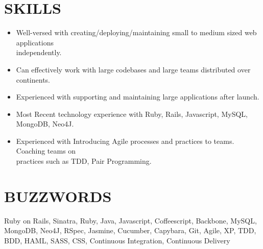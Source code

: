 \documentclass{res}
\begin{document}
\begin{resume}
\section{SKILLS} \vspace{0.15in}         
 \begin{itemize} \itemsep 0pt  
 \setlength{\itemindent}{-1.8em}
\item Well-versed with creating/deploying/maintaining small to medium sized web applications\\ independently.
\item Can effectively work with large codebases and large teams distributed over continents.
\item Experienced with supporting and maintaining large applications after launch.
\item Most Recent technology experience with Ruby, Rails, Javascript, MySQL, MongoDB, Neo4J. 
\item Experienced with Introducing Agile processes and practices to teams. Coaching teams on \\practices such as TDD, Pair Programming.

 \end{itemize}

\vspace{0.05in}         
\section{BUZZWORDS}\vspace{0.15in}
Ruby on Rails, Sinatra, Ruby, Java, Javascript, Coffeescript, Backbone, MySQL, MongoDB, Neo4J, RSpec, Jasmine, Cucumber, Capybara, Git, Agile, XP, TDD, BDD, HAML, SASS, CSS, Continuous Integration, Continuous Delivery 
 
\end{resume}
\end{document}
